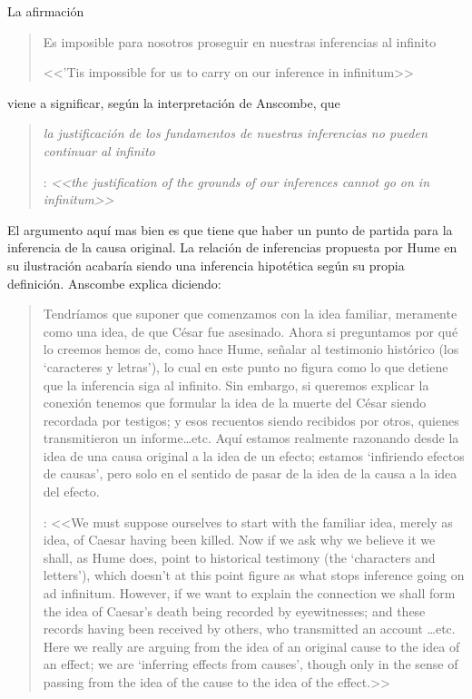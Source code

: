 La afirmación \blockquote[<<'Tis impossible for us to carry on our inference in infinitum>>]{Es imposible para nosotros proseguir en nuestras inferencias al infinito} viene a significar, según la interpretación de Anscombe, que \blockquote[{\cite[Cf.~][87]{anscombe1981parmenides:humeandjulius}}: \emph{<<the justification of the grounds of our inferences cannot go on in infinitum>>}]{\emph{la justificación de los fundamentos de nuestras inferencias no pueden continuar al infinito}}. El argumento aquí mas bien es que tiene que haber un punto de partida para la inferencia de la causa original. La relación de inferencias propuesta por Hume en su ilustración acabaría siendo una inferencia hipotética según su propia definición. Anscombe explica diciendo: \blockquote[{\cite[117]{anscombe2011plato:humecaus}}: <<We must suppose ourselves to start with the familiar idea, merely as idea, of Caesar having been killed. Now if we ask why we believe it we shall, as Hume does, point to historical testimony (the ‘characters and letters’), which doesn’t at this point figure as what stops inference going on ad infinitum. However, if we want to explain the connection we shall form the idea of Caesar’s death being recorded by eyewitnesses; and these records having been received by others, who transmitted an account \ldots etc. Here we really are arguing from the idea of an original cause to the idea of an effect; we are ‘inferring effects from causes’, though only in the sense of passing from the idea of the cause to the idea of the effect.>>]{Tendríamos que suponer que comenzamos con la idea familiar, meramente como una idea, de que César fue asesinado. Ahora si preguntamos por qué lo creemos hemos de, como hace Hume, señalar al testimonio histórico (los `caracteres y letras'), lo cual en este punto no figura como lo que detiene que la inferencia siga al infinito. Sin embargo, si queremos explicar la conexión tenemos que formular la idea de la muerte del César siendo recordada por testigos; y esos recuentos siendo recibidos por otros, quienes transmitieron un informe\ldots etc. Aquí estamos realmente razonando desde la idea de una causa original a la idea de un efecto; estamos `infiriendo efectos de causas', pero solo en el sentido de pasar de la idea de la causa a la idea del efecto.}

